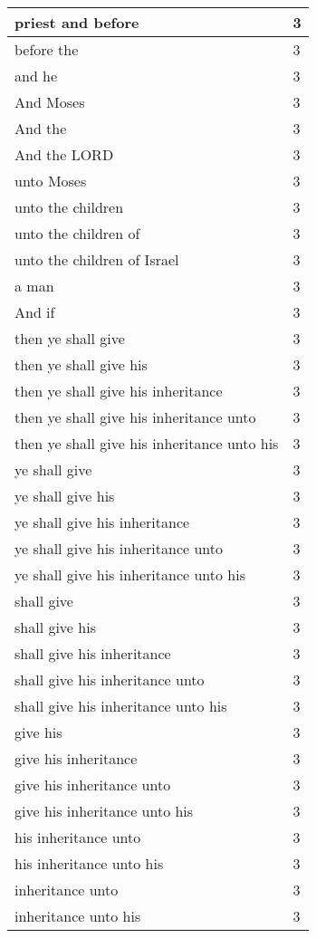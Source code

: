 \begin{center}
\begin{longtable}{|p{3.0in}|p{0.5in}|}
priest and before & 3\\ \hline 
before the & 3\\ \hline 
and he & 3\\ \hline 
And Moses & 3\\ \hline 
And the & 3\\ \hline 
And the LORD & 3\\ \hline 
unto Moses & 3\\ \hline 
unto the children & 3\\ \hline 
unto the children of & 3\\ \hline 
unto the children of Israel & 3\\ \hline 
a man & 3\\ \hline 
And if & 3\\ \hline 
then ye shall give & 3\\ \hline 
then ye shall give his & 3\\ \hline 
then ye shall give his inheritance & 3\\ \hline 
then ye shall give his inheritance unto & 3\\ \hline 
then ye shall give his inheritance unto his & 3\\ \hline 
ye shall give & 3\\ \hline 
ye shall give his & 3\\ \hline 
ye shall give his inheritance & 3\\ \hline 
ye shall give his inheritance unto & 3\\ \hline 
ye shall give his inheritance unto his & 3\\ \hline 
shall give & 3\\ \hline 
shall give his & 3\\ \hline 
shall give his inheritance & 3\\ \hline 
shall give his inheritance unto & 3\\ \hline 
shall give his inheritance unto his & 3\\ \hline 
give his & 3\\ \hline 
give his inheritance & 3\\ \hline 
give his inheritance unto & 3\\ \hline 
give his inheritance unto his & 3\\ \hline 
his inheritance unto & 3\\ \hline 
his inheritance unto his & 3\\ \hline 
inheritance unto & 3\\ \hline 
inheritance unto his & 3\\ \hline 

\end{longtable}
\end{center}
